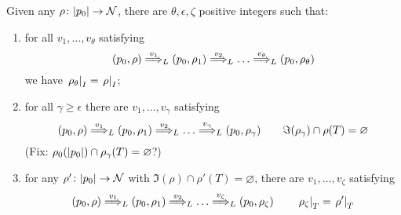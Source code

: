 \begin{lemma} Given any $\rho \colon |p_0| \to \mathcal{N}$, there are $\theta,\epsilon,\zeta$ positive integers such that:
\label{lem:IT}
\begin{enumerate}

\item
for all $v_1,\dots,v_\theta$ satisfying
\[
	(p_0,\rho) \overset{v_1}{\Longrightarrow}_{L} (p_0,\rho_1) \overset{v_2}{\Longrightarrow}_{L} \dots \overset{v_{\theta}}{\Longrightarrow}_{L} (p_0,\rho_\theta)
\]
we have $\left. \rho_\theta \right|_{I} = \left. \rho \right|_{I}$;
\label{idI}

\item %
for all $\gamma \geq \epsilon$ there are $v_1,\dots,v_\gamma$ satisfying
\[
	(p_0,\rho) \overset{v_1}{\Longrightarrow}_{L} (p_0,\rho_1) \overset{v_2}{\Longrightarrow}_{L} \dots \overset{v_\gamma}{\Longrightarrow}_{L} (p_0,\rho_\gamma)
	\qquad 
	\Im(\rho_\gamma) \cap \rho(T) = \varnothing
\]
(Fix: $\rho_0(|p_0|) \cap \rho_\gamma(T) = \varnothing$?)
\label{forgetT}
\item
for any $\rho' \colon |p_0| \to \mathcal{N}$ with $\Im(\rho) \cap \rho'(T) = \varnothing$, there are $v_1,\dots,v_\zeta$ satisfying
\[
	(p_0,\rho) \overset{v_1}{\Longrightarrow}_{L} (p_0,\rho_1) \overset{v_2}{\Longrightarrow}_{L} \dots \overset{v_\zeta}{\Longrightarrow}_{L} (p_0,\rho_\zeta)	
	\qquad
	\left.\rho_\zeta\right|_{T} = \left.\rho'\right|_{T}
\]
\label{initT}
\end{enumerate}
\end{lemma}
